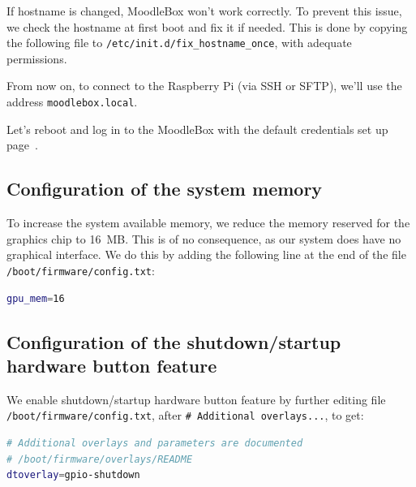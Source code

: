 \documentclass[12pt]{article}
\begin{document}
If hostname is changed, MoodleBox won't work correctly.
To prevent this issue, we check the hostname at first boot and fix it if needed.
This is done by copying the following file to \lstinline{/etc/init.d/fix_hostname_once}, with adequate permissions.



From now on, to connect to the Raspberry Pi (via SSH or SFTP), we'll use the address \lstinline{moodlebox.local}.

Let's reboot and log in to the MoodleBox with the default credentials set up page~\pageref{ssec-new-account}.

\subsection{Configuration of the system memory}

To increase the system available memory, we reduce the memory reserved for the graphics chip to 16~MB.
This is of no consequence, as our system does have no graphical interface.
We do this by adding the following line at the end of the file \lstinline{/boot/firmware/config.txt}:
\begin{lstlisting}[language=bash]
gpu_mem=16
\end{lstlisting}

\subsection{Configuration of the shutdown/startup hardware button feature}

We enable shutdown/startup hardware button feature by further editing file \lstinline{/boot/firmware/config.txt}, after \lstinline{# Additional overlays...}, to get:
\begin{lstlisting}[language=bash]
# Additional overlays and parameters are documented
# /boot/firmware/overlays/README
dtoverlay=gpio-shutdown
\end{lstlisting}
\end{document}
